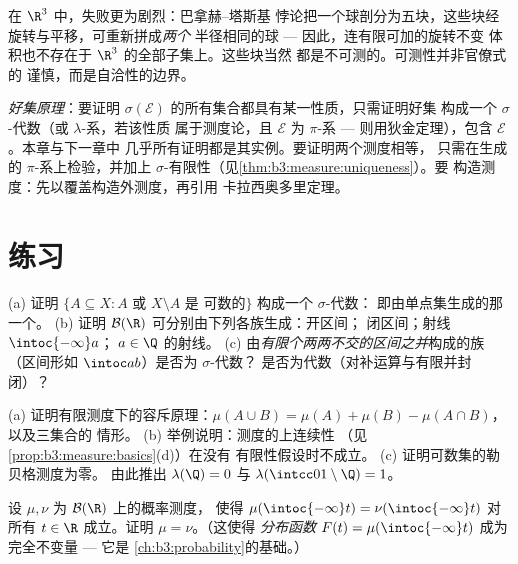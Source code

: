 \begin{remark}\label{rem:b3:measure:banachtarski}
在 $\R^3$ 中，失败更为剧烈：巴拿赫--塔斯基
悖论把一个球剖分为五块，这些块经
旋转与平移，可重新拼成\emph{两个}
半径相同的球 --- 因此，连有限可加的旋转不变
体积也不存在于 $\R^3$ 的全部子集上。这些块当然
都是不可测的。可测性并非官僚式的
谨慎，而是自洽性的边界。
\end{remark}

\begin{method}\label{met:b3:measure:goodsets}
\emph{好集原理}：要证明
$\sigma(\mathcal E)$ 的所有集合都具有某一性质，只需证明好集
构成一个 $\sigma$-代数（或 $\lambda$-系，若该性质
属于测度论，且 $\mathcal E$ 为 $\pi$-系 ---
则用狄金定理），包含 $\mathcal E$。本章与下一章中
几乎所有证明都是其实例。要证明两个测度相等，
只需在生成的 $\pi$-系上检验，并加上
$\sigma$-有限性（见\cref{thm:b3:measure:uniqueness}）。要
构造测度：先以覆盖构造外测度，再引用
卡拉西奥多里定理。
\end{method}

\section{练习}

\begin{exercise}[$\star$]\label{exo:b3:measure:1}
(a) 证明 $\{A \subseteq X : A$ 或 $X\setminus A$ 是
可数的$\}$ 构成一个 $\sigma$-代数：
即由单点集生成的那一个。
(b) 证明 $\mathcal B(\R)$ 可分别由下列各族生成：开区间；
闭区间；射线 $\intoc{-\infty}a$；
$a \in \Q$ 的射线。
(c) 由\emph{有限个两两不交的区间之并}构成的族
（区间形如 $\intoc ab$）是否为 $\sigma$-代数？
是否为代数（对补运算与有限并封闭）？
\end{exercise}

\begin{exercise}[$\star$]\label{exo:b3:measure:2}
(a) 证明有限测度下的容斥原理：$\mu(A\cup
B) = \mu(A) + \mu(B) - \mu(A\cap B)$，以及三集合的
情形。
(b) 举例说明：测度的上连续性
（见\cref{prop:b3:measure:basics}(d)）在没有
有限性假设时不成立。
(c) 证明可数集的勒贝格测度为零。
由此推出 $\lambda(\Q) = 0$ 与 $\lambda(\intcc01\setminus\Q) =
1$。
\end{exercise}

\begin{exercise}[$\star\star$]\label{exo:b3:measure:3}
设 $\mu, \nu$ 为 $\mathcal B(\R)$ 上的概率测度，
使得 $\mu(\intoc{-\infty}t) = \nu(\intoc{-\infty}t)$ 对所有
$t \in \R$ 成立。证明 $\mu = \nu$。（这使得
\emph{分布函数} $F(t) = \mu(\intoc{-\infty}t)$ 成为
完全不变量 --- 它是
\cref{ch:b3:probability}的基础。）
\end{exercise}

